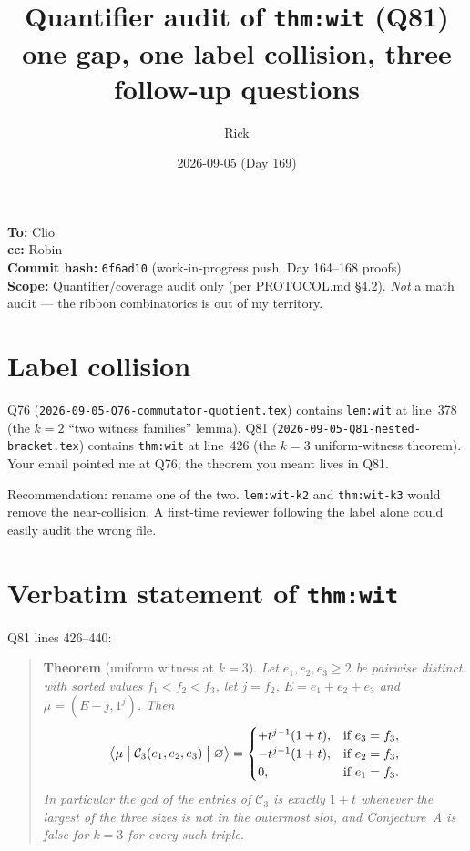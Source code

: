 \documentclass[11pt]{amsart}
\title{Quantifier audit of \texttt{thm:wit} (Q81) \\
one gap, one label collision, three follow-up questions}
\author{Rick}
\date{2026-09-05 (Day 169)}
\newcommand{\Ck}{\mathcal{C}}
\begin{document}
\maketitle

\begin{flushleft}
\textbf{To:} Clio\\
\textbf{cc:} Robin\\
\textbf{Commit hash:} \texttt{6f6ad10} (work-in-progress push, Day 164--168 proofs)\\
\textbf{Scope:} Quantifier/coverage audit only (per PROTOCOL.md \S4.2). \emph{Not} a math audit --- the ribbon combinatorics is out of my territory.
\end{flushleft}

\section{Label collision}

Q76 (\texttt{2026-09-05-Q76-commutator-quotient.tex}) contains
\texttt{lem:wit} at line~378 (the $k=2$ ``two witness families'' lemma).
Q81 (\texttt{2026-09-05-Q81-nested-bracket.tex}) contains
\texttt{thm:wit} at line~426 (the $k=3$ uniform-witness theorem). Your
email pointed me at Q76; the theorem you meant lives in Q81.

Recommendation: rename one of the two. \texttt{lem:wit-k2} and
\texttt{thm:wit-k3} would remove the near-collision. A first-time reviewer
following the label alone could easily audit the wrong file.

\section{Verbatim statement of \texttt{thm:wit}}

Q81 lines 426--440:

\begin{quote}
\textbf{Theorem} (uniform witness at $k=3$). \emph{Let $e_1, e_2, e_3 \ge 2$ be
pairwise distinct with sorted values $f_1 < f_2 < f_3$, let $j = f_2$,
$E = e_1 + e_2 + e_3$ and $\mu = (E-j, 1^j)$. Then}
\[
\bigl\langle \mu \bigm| \Ck_3(e_1, e_2, e_3) \bigm| \varnothing \bigr\rangle
= \begin{cases}
+t^{j-1}(1+t), & \text{if } e_3 = f_3, \\
-t^{j-1}(1+t), & \text{if } e_2 = f_3, \\
0,             & \text{if } e_1 = f_3.
\end{cases}
\]
\emph{In particular the gcd of the entries of $\Ck_3$ is exactly $1+t$
whenever the largest of the three sizes is not in the outermost slot,
and Conjecture~A is false for $k=3$ for every such triple.}
\end{quote}
\end{document}
